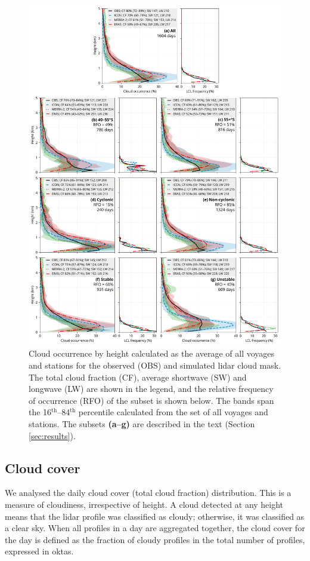 \documentclass[12pt,a4paper]{article}
\begin{document}
\begin{figure}[p!]
\centering
\includegraphics[width=\textwidth]{img/cl_agg.pdf}
\caption{
Cloud occurrence by height calculated as the average of all voyages and
stations for the observed (OBS) and simulated lidar cloud mask. The total cloud
fraction (CF), average shortwave (SW) and longwave (LW) are shown in the
legend, and the relative frequency of occurrence (RFO) of the subset is shown
below.  The bands span the 16$^\mathrm{th}$--84$^\mathrm{th}$ percentile
calculated from the set of all voyages and stations. The subsets
\textbf{(a--g)} are described in the text (Section \ref{sec:results}).
}
\label{fig:cloud-occurrence}
\end{figure}

\subsection{Cloud cover}

We analysed the daily cloud cover (total cloud fraction) distribution. This is
a measure of cloudiness, irrespective of height. A cloud detected at any height
means that the lidar profile was classified as cloudy; otherwise, it was
classified as a clear sky. When all profiles in a day are aggregated together,
the cloud cover for the day is defined as the fraction of cloudy profiles in
the total number of profiles, expressed in oktas.
\end{document}
